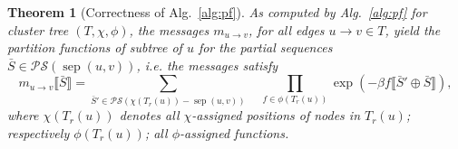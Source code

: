 \documentclass[10pt]{article}
\newtheorem{theorem}{Theorem}
\newcommand{\val}{\bar S} %
\newcommand{\separator}[2]{\operatorname{sep}(#1,#2)}
\newcommand{\Message}[2]{m_{#1\rightarrow #2}}
\newcommand{\partseqs}{\mathcal{P\!S}}
\newcommand{\evalfor}[2]{#1\llbracket{}#2\rrbracket{}}
\newcommand{\substitute}[2]{#1\!\oplus\!#2}
\begin{document}
\begin{theorem}[Correctness of Alg.~\ref{alg:pf}]
  \label{the:pfalgo-correctness}
  As computed by Alg.~\ref{alg:pf} for cluster tree $(T,\chi,\phi)$,
  the messages $\Message{u}{v}$, for all edges $u\to{}v\in T$, yield
  the partition functions of subtree of $u$ for the partial sequences
  $\val\in\partseqs(\separator{u}{v})$, i.e. the messages satisfy
  \begin{equation}
   \evalfor{\Message{u}{v}}{\val} = \sum_{\val'\in\partseqs(\chi(T_r(u))-\separator{u}{v})} \quad
   \prod_{f\in\phi(T_r(u))} \exp(-\beta \evalfor{f}{\substitute{\val'}{\val}}),\label{eq:pfalgo-correct}
 \end{equation}
 where $\chi(T_r(u))$ denotes all $\chi$-assigned positions of nodes in $T_r(u)$;
 respectively $\phi(T_r(u))$; all $\phi$-assigned functions.
%
\end{theorem}
\end{document}
